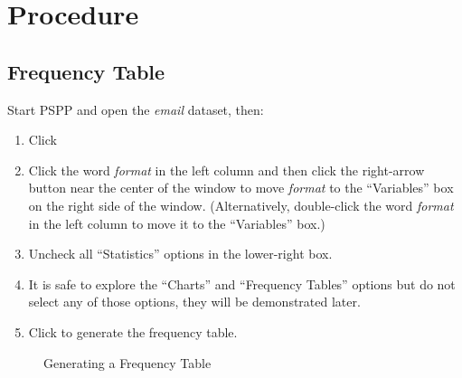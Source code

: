 \section{Procedure}

\subsection{Frequency Table}

Start \acs{PSPP} and open the \textit{email} dataset, then:

\begin{enumerate}
  \item Click \textsc{}
  \item Click the word \textit{format} in the left column and then click the right-arrow button near the center of the window to move \textit{format} to the ``Variables'' box on the right side of the window. (Alternatively, double-click the word \textit{format} in the left column to move it to the ``Variables'' box.)
  \item Uncheck all ``Statistics'' options in the lower-right box.
  \item It is safe to explore the ``Charts'' and ``Frequency Tables'' options but do not select any of those options, they will be demonstrated later.
  \item Click  to generate the frequency table.
\end{enumerate}

\begin{figure}[H]
  \begin{center}
    \caption{Generating a Frequency Table}
    \label{lab02_fig03}    
  \end{center}
\end{figure}

